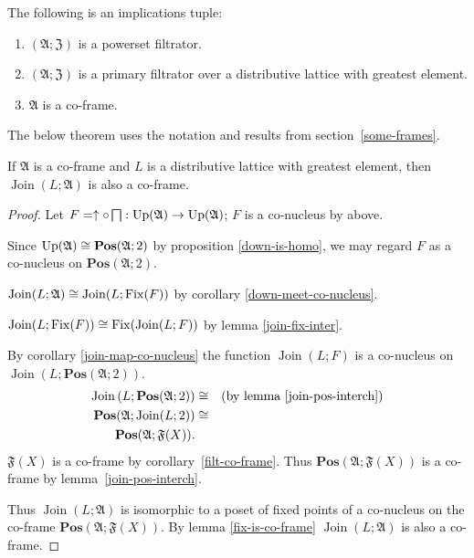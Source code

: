 \begin{cor}\label{filt-co-frame}
The following is an implications tuple:
\begin{enumerate}
\item $(\mathfrak{A};\mathfrak{Z})$ is a powerset filtrator.
\item $(\mathfrak{A};\mathfrak{Z})$ is a primary filtrator over a distributive
lattice with greatest element.
\item $\mathfrak{A}$ is a co-frame.
\end{enumerate}
\end{cor}

The below theorem uses the notation and results from section~\ref{some-frames}.
\begin{thm}
\label{frame-main}If $\mathfrak{A}$ is a co-frame and $L$ is a
distributive lattice with greatest element, then $\operatorname{Join}(L;\mathfrak{A})$
is also a co-frame.
\end{thm}
\begin{proof}
Let $F=\uparrow\circ\bigsqcap:\operatorname{Up}(\mathfrak{A})\rightarrow\operatorname{Up}(\mathfrak{A})$;
$F$ is a co-nucleus by above.

Since $\operatorname{Up}(\mathfrak{A})\cong\mathbf{Pos}(\mathfrak{A};2)$ by
proposition \ref{down-is-homo}, we may regard $F$ as a co-nucleus
on $\mathbf{Pos}(\mathfrak{A};2)$.

$\operatorname{Join}(L;\mathfrak{A})\cong\operatorname{Join}(L;\operatorname{Fix}(F))$
by corollary \ref{down-meet-co-nucleus}.

$\operatorname{Join}(L;\operatorname{Fix}(F))\cong\operatorname{Fix}(\operatorname{Join}(L;F))$
by lemma \ref{join-fix-inter}.

By corollary \ref{join-map-co-nucleus} the function $\operatorname{Join}(L;F)$
is a co-nucleus on $\operatorname{Join}\left(L;\mathbf{Pos}(\mathfrak{A};2)\right)$.
\begin{eqnarray*}
\operatorname{Join}\left(L;\mathbf{Pos}(\mathfrak{A};2)\right) & \cong & \text{(by lemma \ref{join-pos-interch})}\\
\mathbf{Pos}(\mathfrak{A};\operatorname{Join}(L;2)) & \cong\\
\mathbf{Pos}(\mathfrak{A};\mathfrak{F}(X)).
\end{eqnarray*}
$\mathfrak{F}(X)$ is a co-frame by corollary~\ref{filt-co-frame}. Thus
$\mathbf{Pos}(\mathfrak{A};\mathfrak{F}(X))$ is a co-frame by lemma~\ref{join-pos-interch}.

Thus $\operatorname{Join}(L;\mathfrak{A})$ is isomorphic to a poset
of fixed points of a co-nucleus on the co-frame $\mathbf{Pos}(\mathfrak{A};\mathfrak{F}(X))$.
By lemma \ref{fix-is-co-frame} $\operatorname{Join}(L;\mathfrak{A})$
is also a co-frame.
\end{proof}


